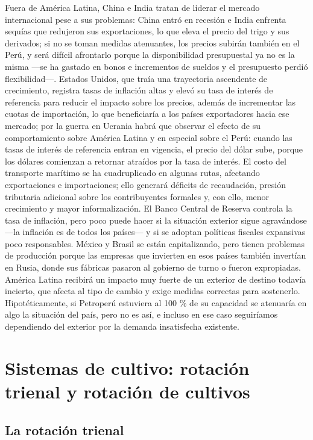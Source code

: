 \documentclass[
  man,
  floatsintext,
  longtable,
  a4paper,
  nolmodern,
  notxfonts,
  notimes,
  12pt,
  colorlinks=true,linkcolor=blue,citecolor=blue,urlcolor=blue]{apa7}
\begin{document}
Fuera de América Latina, China e India tratan de liderar el mercado
internacional pese a sus problemas: China entró en recesión e India
enfrenta sequías que redujeron sus exportaciones, lo que eleva el precio
del trigo y sus derivados; si no se toman medidas atenuantes, los
precios subirán también en el Perú, y será difícil afrontarlo porque la
disponibilidad presupuestal ya no es la misma ---se ha gastado en bonos
e incrementos de sueldos y el presupuesto perdió flexibilidad---.
Estados Unidos, que traía una trayectoria ascendente de crecimiento,
registra tasas de inflación altas y elevó su tasa de interés de
referencia para reducir el impacto sobre los precios, además de
incrementar las cuotas de importación, lo que beneficiaría a los países
exportadores hacia ese mercado; por la guerra en Ucrania habrá que
observar el efecto de su comportamiento sobre América Latina y en
especial sobre el Perú: cuando las tasas de interés de referencia entran
en vigencia, el precio del dólar sube, porque los dólares comienzan a
retornar atraídos por la tasa de interés. El costo del transporte
marítimo se ha cuadruplicado en algunas rutas, afectando exportaciones e
importaciones; ello generará déficits de recaudación, presión tributaria
adicional sobre los contribuyentes formales y, con ello, menor
crecimiento y mayor informalización. El Banco Central de Reserva
controla la tasa de inflación, pero poco puede hacer si la situación
exterior sigue agravándose ---la inflación es de todos los países--- y
si se adoptan políticas fiscales expansivas poco responsables. México y
Brasil se están capitalizando, pero tienen problemas de producción
porque las empresas que invierten en esos países también invertían en
Rusia, donde sus fábricas pasaron al gobierno de turno o fueron
expropiadas. América Latina recibirá un impacto muy fuerte de un
exterior de destino todavía incierto, que afecta al tipo de cambio y
exige medidas correctas para sostenerlo. Hipotéticamente, si Petroperú
estuviera al 100 \% de su capacidad se atenuaría en algo la situación
del país, pero no es así, e incluso en ese caso seguiríamos dependiendo
del exterior por la demanda insatisfecha existente.

\section{Sistemas de cultivo: rotación trienal y rotación de
cultivos}\label{sistemas-de-cultivo-rotaciuxf3n-trienal-y-rotaciuxf3n-de-cultivos}

\subsection{La rotación trienal}\label{la-rotaciuxf3n-trienal}
\end{document}
